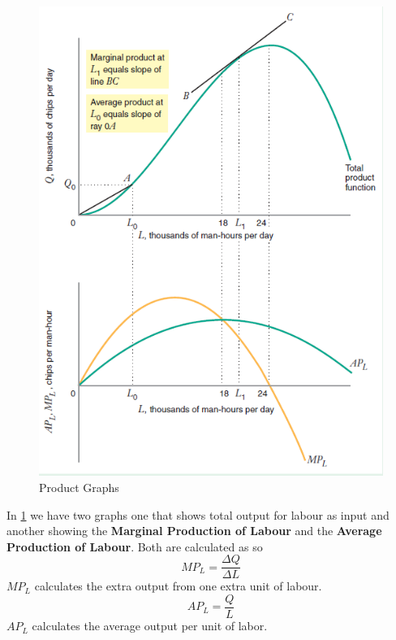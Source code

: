\documentclass[../ECON-281-Notes.tex]{subfiles}
\begin{document}
\begin{figure}[]
    \centering
    \includegraphics[width=\columnwidth]{../assets/Production_graphs.png}
    \caption{Product Graphs}
    \label{fig:product_graphs}
\end{figure}

In \cref{fig:product_graphs} we have two graphs one that shows total output for labour as input and another showing the \textbf{Marginal Production of Labour} and the \textbf{Average Production of Labour}. 
Both are calculated as so
\begin{equation}
    MP_L = \frac{\Delta Q}{\Delta L}    
\end{equation}
\(MP_L\) calculates the extra output from one extra unit of labour.
\begin{equation}
    AP_L = \frac{Q}{L}  
\end{equation}
\(AP_L\) calculates the average output per unit of labor.
\end{document}
